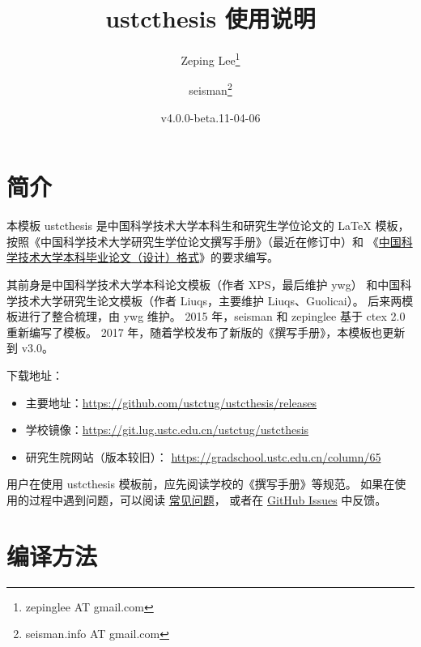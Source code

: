 \documentclass[a4paper]{ltxdoc}
\DeclareRobustCommand\pkg{\textsf}
\DeclareRobustCommand\cls{\textsf}
\begin{document}
\title{\cls{ustcthesis} 使用说明}
\author{Zeping Lee\thanks{zepinglee AT gmail.com} \and
        seisman\thanks{seisman.info AT gmail.com} }
\date{v4.0.0-beta.11-04-06}
\maketitle



\section{简介}

本模板 \cls{ustcthesis} 是中国科学技术大学本科生和研究生学位论文的 \LaTeX{}
模板， 按照《中国科学技术大学研究生学位论文撰写手册》（最近在修订中）和
《\href{https://www.teach.ustc.edu.cn/?attachment_id=13867}
{中国科学技术大学本科毕业论文（设计）格式}》的要求编写。

其前身是中国科学技术大学本科论文模板（作者 XPS，最后维护 ywg）
和中国科学技术大学研究生论文模板（作者 Liuqs，主要维护 Liuqs、Guolicai）。
后来两模板进行了整合梳理，由 ywg 维护。
2015 年，seisman 和 zepinglee 基于 \pkg{ctex} 2.0 重新编写了模板。
2017 年，随着学校发布了新版的《撰写手册》，本模板也更新到 v3.0。

下载地址：
\begin{itemize}
  \item 主要地址：\url{https://github.com/ustctug/ustcthesis/releases}
  \item 学校镜像：\url{https://git.lug.ustc.edu.cn/ustctug/ustcthesis}
  \item 研究生院网站（版本较旧）：
    \url{https://gradschool.ustc.edu.cn/column/65}
\end{itemize}

用户在使用 \pkg{ustcthesis} 模板前，应先阅读学校的《撰写手册》等规范。
如果在使用的过程中遇到问题，可以阅读
\href{https://github.com/ustctug/ustcthesis/wiki}{常见问题}，
或者在 \href{https://github.com/ustctug/ustcthesis/issues}{GitHub Issues}
中反馈。



\section{编译方法}
\end{document}
